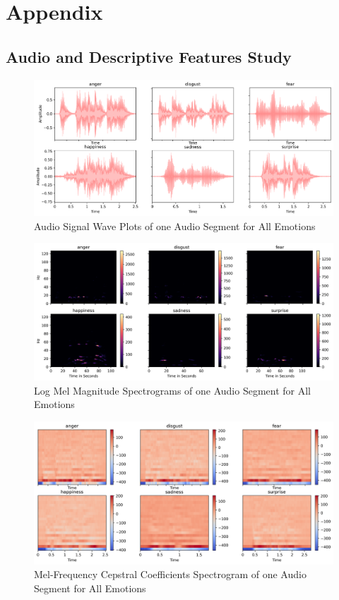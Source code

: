\chapter{Appendix}

\appendix \label{appendix}

\section{Audio and Descriptive Features Study} \label{sec:App:1}

\begin{figure}[H]
	\centering
	\includegraphics[width=.9\linewidth]{figs/appendix/feature_selection/signalWP.png}
	\caption{Audio Signal Wave Plots of one Audio Segment for All Emotions}
	\label{fig:signalWP}
\end{figure}

\begin{figure}[H]
	\centering
	\includegraphics[width=.9\linewidth]{figs/appendix/feature_selection/melSpect.png}
	\caption{Log Mel Magnitude Spectrograms of one Audio Segment for All Emotions}
	\label{fig:melSpect}
\end{figure}

\begin{figure}[H]
	\centering
	\includegraphics[width=.9\linewidth]{figs/appendix/feature_selection/mfccSpec.png}
	\caption{Mel-Frequency Cepstral Coefficients Spectrogram of one Audio Segment for All Emotions}
	\label{fig:mfccSpec}
\end{figure}


